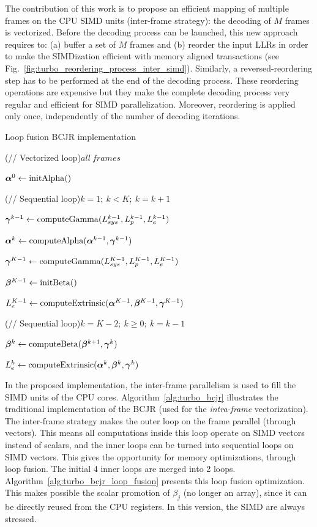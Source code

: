 The contribution of this work is to propose an efficient mapping of multiple
frames on the CPU SIMD units (inter-frame strategy): the decoding of $M$ frames
is vectorized. Before the decoding process can be launched, this new approach
requires to: (a) buffer a set of $M$ frames and (b) reorder the input LLRs in
order to make the SIMDization efficient with memory aligned transactions (see
Fig.~\ref{fig:turbo_reordering_process_inter_simd}). Similarly, a
reversed-reordering step has to be performed at the end of the decoding process.
These reordering operations are expensive but they make the complete decoding
process very regular and efficient for SIMD parallelization. Moreover,
reordering is applied only once, independently of the number of decoding
iterations.

\begin{algorithm}
  \caption{Loop fusion BCJR implementation}
  \label{alg:turbo_bcjr_loop_fusion}

  \For(// Vectorized loop){$all~frames$}
  {
    $\boldsymbol{\alpha}^0\gets \operatorname*{initAlpha}()$

    \For(// Sequential loop){$k=1;~k<K;~k=k+1$}
    {
      $\boldsymbol{\gamma}^{k-1}\gets \operatorname*{computeGamma}(L_{sys}^{k-1}, L_{p}^{k-1}, L_{e}^{k-1})$

      $\boldsymbol{\alpha}^k\gets \operatorname*{computeAlpha}(\boldsymbol{\alpha}^{k-1}, \boldsymbol{\gamma}^{k-1})$
    }

    $\boldsymbol{\gamma}^{K-1}\gets \operatorname*{computeGamma}(L_{sys}^{K-1}, L_{p}^{K-1}, L_{e}^{K-1})$

    $\boldsymbol{\beta}^{K-1}\gets \operatorname*{initBeta}()$

    $L_e^{K-1}\gets \operatorname*{computeExtrinsic}(\boldsymbol{\alpha}^{K-1}, \boldsymbol{\beta}^{K-1}, \boldsymbol{\gamma}^{K-1})$

    \For(// Sequential loop){$k=K-2;~k \geq 0;~k=k-1$}
    {
      $\boldsymbol{\beta}^k\gets \operatorname*{computeBeta}(\boldsymbol{\beta}^{k+1}, \boldsymbol{\gamma}^{k})$

      $L_e^{k}\gets \operatorname*{computeExtrinsic}(\boldsymbol{\alpha}^{k}, \boldsymbol{\beta}^k, \boldsymbol{\gamma}^{k})$
    }
  }
\end{algorithm}

In the proposed implementation, the inter-frame parallelism is used to fill the
SIMD units of the CPU cores. Algorithm~\ref{alg:turbo_bcjr} illustrates the
traditional implementation of the BCJR (used for the \emph{intra-frame}
vectorization). The inter-frame strategy makes the outer loop on the frame
parallel (through vectors). This means all computations inside this loop operate
on SIMD vectors instead of scalars, and the inner loops can be turned into
sequential loops on SIMD vectors. This gives the opportunity for memory
optimizations, through loop fusion. The initial 4 inner loops are merged into 2
loops. Algorithm~\ref{alg:turbo_bcjr_loop_fusion} presents this loop fusion
optimization. This makes possible the scalar promotion of $\beta_j$ (no longer
an array), since it can be directly reused from the CPU registers. In this
version, the SIMD are always stressed.

